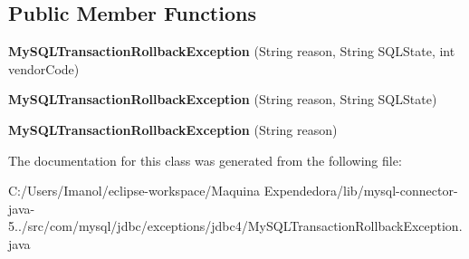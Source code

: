 \subsection*{Public Member Functions}
\begin{DoxyCompactItemize}
\item 
\mbox{\label{classcom_1_1mysql_1_1jdbc_1_1exceptions_1_1jdbc4_1_1_my_s_q_l_transaction_rollback_exception_a060169736f41fa68219e38580cd353f2}} 
{\bfseries My\+S\+Q\+L\+Transaction\+Rollback\+Exception} (String reason, String S\+Q\+L\+State, int vendor\+Code)
\item 
\mbox{\label{classcom_1_1mysql_1_1jdbc_1_1exceptions_1_1jdbc4_1_1_my_s_q_l_transaction_rollback_exception_acb2e0a3f7bb9332f652fcb487689a06c}} 
{\bfseries My\+S\+Q\+L\+Transaction\+Rollback\+Exception} (String reason, String S\+Q\+L\+State)
\item 
\mbox{\label{classcom_1_1mysql_1_1jdbc_1_1exceptions_1_1jdbc4_1_1_my_s_q_l_transaction_rollback_exception_a4018205bf4032dfd1042f4d3c6804e86}} 
{\bfseries My\+S\+Q\+L\+Transaction\+Rollback\+Exception} (String reason)
\end{DoxyCompactItemize}


The documentation for this class was generated from the following file\+:\begin{DoxyCompactItemize}
\item 
C\+:/\+Users/\+Imanol/eclipse-\/workspace/\+Maquina Expendedora/lib/mysql-\/connector-\/java-\/5../src/com/mysql/jdbc/exceptions/jdbc4/My\+S\+Q\+L\+Transaction\+Rollback\+Exception.\+java\end{DoxyCompactItemize}
